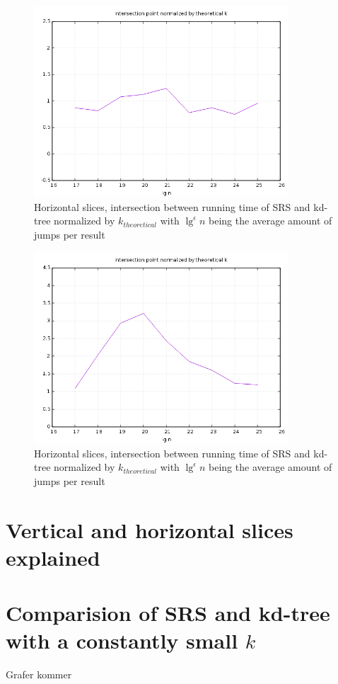 \begin{figure}[h]
    \centering
    \includegraphics[width = 0.85\textwidth]{pictures/analysis/hori_theory.png}
    \caption{Horizontal slices, intersection between running time of SRS and kd-tree normalized by $k_{theoretical}$ with $\lg^\epsilon n$ being the average amount of jumps per result}\label{fig:hori_theory}
\end{figure}


\begin{figure}[h]
    \centering
    \includegraphics[width = 0.85\textwidth]{pictures/analysis/hori_theory_worst_jump.png}
    \caption{Horizontal slices, intersection between running time of SRS and kd-tree normalized by $k_{theoretical}$ with $\lg^\epsilon n$ being the average amount of jumps per result}\label{fig:vert_theory}
\end{figure}

\section{Vertical and horizontal slices explained}



\section{Comparision of SRS and kd-tree with a constantly small $k$}

Grafer kommer

